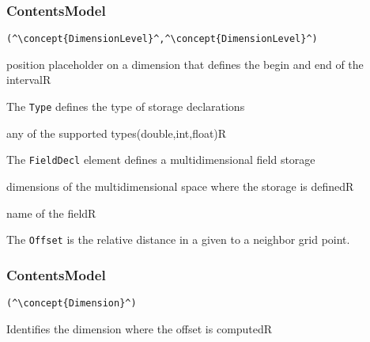 \subsubsection*{ContentsModel}{}

\begin{lstlisting}[style=default]
(^\concept{DimensionLevel}^,^\concept{DimensionLevel}^)
\end{lstlisting}

\begin{HIRChildElements}
	{position placeholder on a dimension that defines the begin and end of the interval}{R}
\end{HIRChildElements}


The {\tt Type} defines the type of storage declarations
\HIRContentsModel{ () }

\begin{HIRAttributesVal}
	{any of the supported types}{(double,int,float)}{R}
\end{HIRAttributesVal}

The {\tt FieldDecl} element defines a multidimensional field storage

\begin{HIRChildElements}
	{dimensions of the multidimensional space where the storage is defined}{R}
\end{HIRChildElements}

\begin{HIRAttributes}
	{name of the field}{R}
\end{HIRAttributes}


The {\tt Offset} is the relative distance in a given  to a neighbor grid point.

\subsubsection*{ContentsModel}{}

\begin{lstlisting}[style=default]
(^\concept{Dimension}^)
\end{lstlisting}

\begin{HIRChildElements}
	{Identifies the dimension where the offset is computed}{R}
\end{HIRChildElements}

